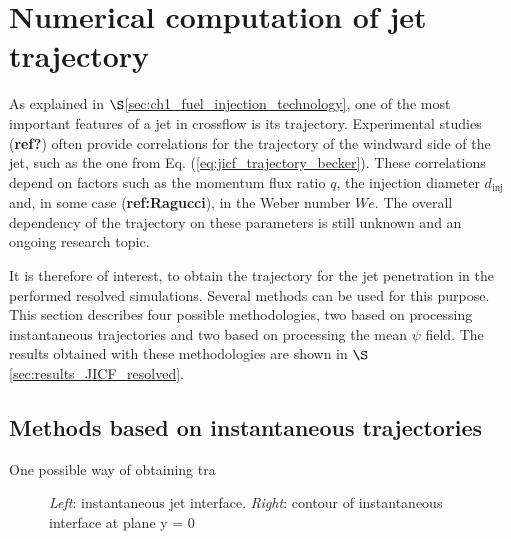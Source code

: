 \section{Numerical computation of jet trajectory}
	\label{sec:ch5_jicf_trajectories}

As explained in $\S$\ref{sec:ch1_fuel_injection_technology}, one of the most important features of a jet in crossflow is its trajectory. Experimental studies (\textbf{ref?}) often provide correlations for the trajectory of the windward side of the jet, such as the one from Eq. (\ref{eq:jicf_trajectory_becker}). These correlations depend on factors such as the momentum flux ratio $q$, the injection diameter $d_\mathrm{inj}$ and, in some case (\textbf{ref:Ragucci}), in the Weber number $We$. The overall dependency of the trajectory on these parameters is still unknown and an ongoing research topic.

It is therefore of interest, to obtain the trajectory for the jet penetration in the performed resolved simulations. Several methods can be used for this purpose. This section describes four possible methodologies, two based on processing instantaneous trajectories and two based on processing the mean $\psi$ field. The results obtained with these methodologies are shown in $\S$\ref{sec:results_JICF_resolved}.

\subsection{Methods based on instantaneous trajectories}

One possible way of obtaining tra

\begin{figure}[ht]
     \centering
     \begin{subfigure}[b]{0.45\textwidth}
         \centering
     \end{subfigure}
     \begin{subfigure}[b]{0.45\textwidth}
         \centering
     \end{subfigure}
        \caption{\textsl{Left}: instantaneous jet interface. \textsl{Right}: contour of instantaneous interface at plane y = 0}
        \label{fig:trajectory_obtention_instantaneous_general}
\end{figure}


